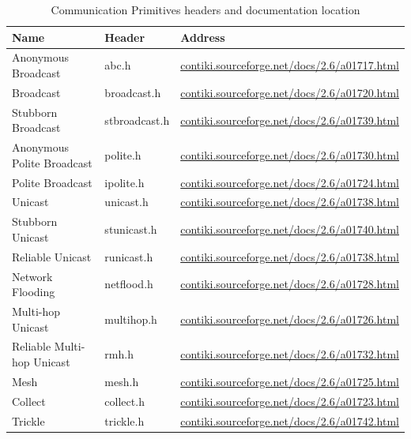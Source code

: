 \begin{table}[H]
	\centering
	\begin{tabular}{ | l | l | l | }
		\hline
		Name & Header & Address \\
		\hline
		Anonymous Broadcast & abc.h & \url{contiki.sourceforge.net/docs/2.6/a01717.html} \\
		Broadcast & broadcast.h & \url{contiki.sourceforge.net/docs/2.6/a01720.html} \\
		Stubborn Broadcast & stbroadcast.h & \url{contiki.sourceforge.net/docs/2.6/a01739.html} \\
		Anonymous Polite Broadcast & polite.h & \url{contiki.sourceforge.net/docs/2.6/a01730.html} \\
		Polite Broadcast & ipolite.h & \url{contiki.sourceforge.net/docs/2.6/a01724.html} \\
		Unicast & unicast.h & \url{contiki.sourceforge.net/docs/2.6/a01738.html} \\
		Stubborn Unicast & stunicast.h & \url{contiki.sourceforge.net/docs/2.6/a01740.html} \\
		Reliable Unicast & runicast.h & \url{contiki.sourceforge.net/docs/2.6/a01738.html} \\
		Network Flooding & netflood.h & \url{contiki.sourceforge.net/docs/2.6/a01728.html} \\
		Multi-hop Unicast & multihop.h & \url{contiki.sourceforge.net/docs/2.6/a01726.html} \\
		Reliable Multi-hop Unicast & rmh.h & \url{contiki.sourceforge.net/docs/2.6/a01732.html} \\
		\hline
		\hline
		Mesh & mesh.h & \url{contiki.sourceforge.net/docs/2.6/a01725.html} \\
		Collect & collect.h & \url{contiki.sourceforge.net/docs/2.6/a01723.html} \\
		Trickle & trickle.h & \url{contiki.sourceforge.net/docs/2.6/a01742.html} \\
		\hline
	\end{tabular}
	\caption{Communication Primitives headers and documentation location}
\end{table}


